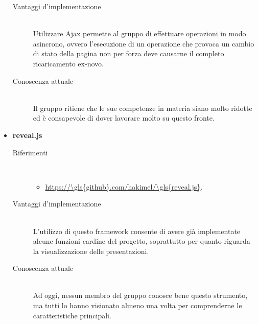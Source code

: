 \begin{itemize}
\begin{description}
		\item[Vantaggi d'implementazione]\ \\ 
		\noindent Utilizzare Ajax permette al gruppo di effettuare operazioni in modo asincrono, ovvero l'esecuzione di un operazione che provoca un cambio di stato della pagina non per forza deve causarne il completo ricaricamento ex-novo.
		
		\item[Conoscenza attuale]\ \\
		\noindent Il gruppo ritiene che le sue competenze in materia siano molto ridotte ed è consapevole di dover lavorare molto su questo fronte.
	\end{description}
	
	\item \textbf{\gls{reveal.js}}
	\begin{description}
		\item[Riferimenti]\ 
		\noindent\begin{itemize}
			\item \url{https://\gls{github}.com/hakimel/\gls{reveal.js}}.
		\end{itemize}
		
		\item[Vantaggi d'implementazione]\ \\ 
		\noindent L'utilizzo di questo framework consente di avere già implementate alcune funzioni cardine del progetto, soprattutto per quanto riguarda la visualizzazione delle presentazioni.
		
		\item[Conoscenza attuale]\ \\
		\noindent Ad oggi, nessun membro del gruppo conosce bene questo strumento, ma tutti lo hanno visionato almeno una volta per comprenderne le caratteristiche principali.
	\end{description}
\end{itemize}

